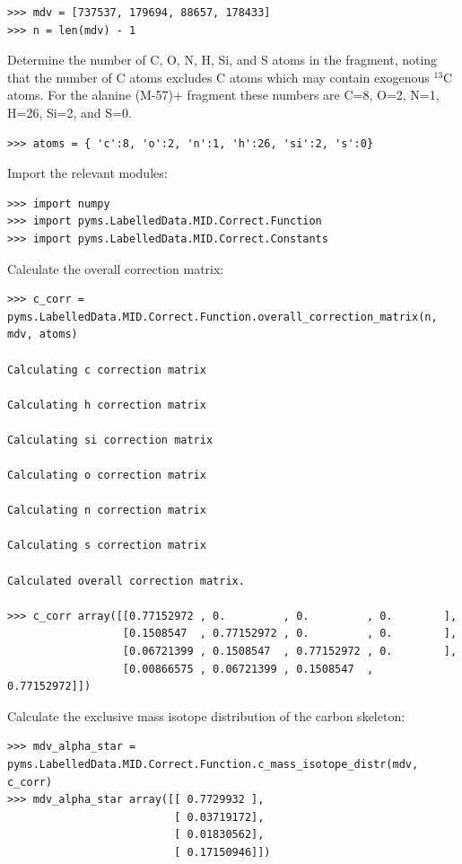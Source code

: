 \begin{verbatim}
>>> mdv = [737537, 179694, 88657, 178433]
>>> n = len(mdv) - 1
\end{verbatim}

Determine the number of C, O, N, H, Si, and S atoms in the fragment,
noting that the number of C atoms excludes C atoms which may contain
exogenous $^{13}$C atoms. For the alanine (M-57)+ fragment these
numbers are C=8, O=2, N=1, H=26, Si=2, and S=0.

\begin{verbatim} 
>>> atoms = { 'c':8, 'o':2, 'n':1, 'h':26, 'si':2, 's':0}
\end{verbatim}

Import the relevant modules:

\begin{verbatim}
>>> import numpy
>>> import pyms.LabelledData.MID.Correct.Function
>>> import pyms.LabelledData.MID.Correct.Constants
\end{verbatim}

Calculate the overall correction matrix:

\begin{verbatim}
>>> c_corr = pyms.LabelledData.MID.Correct.Function.overall_correction_matrix(n, mdv, atoms)

Calculating c correction matrix

Calculating h correction matrix

Calculating si correction matrix

Calculating o correction matrix

Calculating n correction matrix

Calculating s correction matrix

Calculated overall correction matrix.

>>> c_corr array([[0.77152972 , 0.         , 0.         , 0.        ],
                  [0.1508547  , 0.77152972 , 0.         , 0.        ],
                  [0.06721399 , 0.1508547  , 0.77152972 , 0.        ],
                  [0.00866575 , 0.06721399 , 0.1508547  , 0.77152972]])
\end{verbatim}

Calculate the exclusive mass isotope distribution of the carbon skeleton:

\begin{verbatim}
>>> mdv_alpha_star = pyms.LabelledData.MID.Correct.Function.c_mass_isotope_distr(mdv, c_corr)
>>> mdv_alpha_star array([[ 0.7729932 ],
                          [ 0.03719172],
                          [ 0.01830562],
                          [ 0.17150946]])
\end{verbatim}

